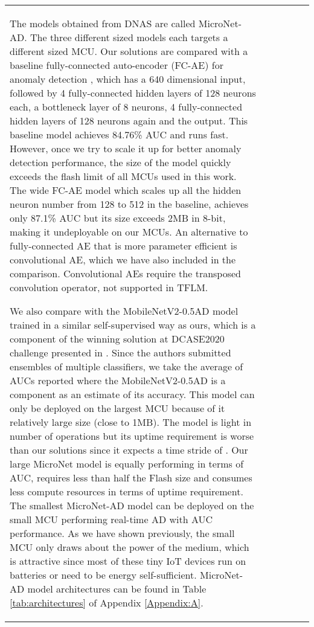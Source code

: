 \documentclass{article}
\begin{document}
\begin{table}[t]
\begin{tabular}{l| c | c | c | c | c}
The models obtained from DNAS are called MicroNet-AD. The three different sized models each targets a different sized MCU. Our solutions are compared with a baseline fully-connected auto-encoder (FC-AE) for anomaly detection \cite{purohit2019mimii}, which has a 640 dimensional input, followed by 4 fully-connected hidden layers of 128 neurons each, a bottleneck layer of 8 neurons, 4 fully-connected hidden layers of 128 neurons again and the output. This baseline model achieves 84.76\% AUC and runs fast. However, once we try to scale it up for better anomaly detection performance, the size of the model quickly exceeds the flash limit of all MCUs used in this work. The wide FC-AE model which scales up all the hidden neuron number from 128 to 512 in the baseline, achieves only 87.1\% AUC but its size exceeds 2MB in 8-bit, making it undeployable on our MCUs. An alternative to fully-connected AE that is more parameter efficient is convolutional AE, which we have also included in the comparison. 
Convolutional AEs require the transposed convolution operator, not supported in TFLM.

We also compare with the MobileNetV2-0.5AD model trained in a similar self-supervised way as ours, which is a component of the winning solution at DCASE2020 challenge \cite{DCASE2020} presented in \citet{Giri2020}. Since the authors submitted ensembles of multiple classifiers, we take the average of AUCs reported where the MobileNetV2-0.5AD is a component as an estimate of its accuracy. This model can only be deployed on the largest MCU because of it relatively large size (close to 1MB). The model is light in number of operations but its uptime requirement is worse than our solutions since it expects a time stride of . Our large MicroNet model is equally performing in terms of AUC, requires less than half the Flash size and consumes less compute resources in terms of uptime requirement. The smallest MicroNet-AD model can be deployed on the small MCU performing real-time AD with  AUC performance. As we have shown previously, the small MCU only draws about  the power of the medium, which is attractive since most of these tiny IoT devices run on batteries or need to be energy self-sufficient. MicroNet-AD model architectures can be found in Table \ref{tab:architectures} of Appendix \ref{Appendix:A}.
\vspace{-5pt}


\end{tabular}
\end{table}
\end{document}

